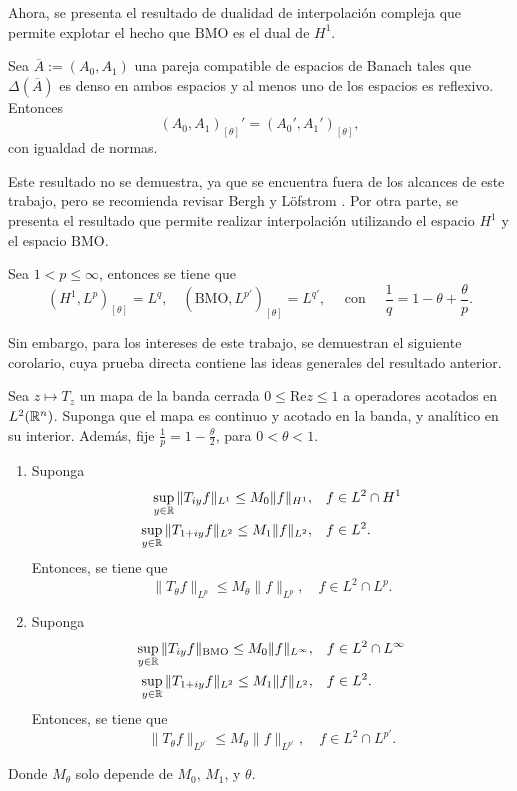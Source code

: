 Ahora, se presenta el resultado de dualidad de interpolación compleja que permite explotar el hecho que $\mathrm{BMO}$ es el dual de $H^1$.
\begin{theorem}
	Sea $\overline{A}:=(A_0, A_1)$ una pareja compatible de espacios de Banach tales que $\Delta(\overline{A})$ es denso en ambos espacios y al menos uno de los espacios es reflexivo. Entonces
	\begin{equation*}
		(A_0, A_1)_{[\theta]}' = (A_0', A_1')_{[\theta]},
	\end{equation*}
	con igualdad de normas.
\end{theorem}
Este resultado no se demuestra, ya que se encuentra fuera de los alcances de este trabajo, pero se recomienda revisar Bergh y Löfstrom \cite{bergh-lofstrom}. Por otra parte, se presenta el resultado que permite realizar interpolación utilizando el espacio $H^1$ y el espacio $\mathrm{BMO}$.
\begin{theorem}
	Sea $1<p\leq\infty$, entonces se tiene que 
	\begin{equation*}
		(H^1,L^p)_{[\theta]} = L^q, \quad (\mathrm{BMO}, L^{p'})_{[\theta]} =L^{q'}, \quad \text{ con } \quad \frac{1}{q} = 1-\theta + \frac{\theta}{p}.
	\end{equation*}
\end{theorem}
Sin embargo, para los intereses de este trabajo, se demuestran el siguiente corolario, cuya prueba directa contiene las ideas generales del resultado anterior.
\begin{corollary}
	Sea $z\mapsto T_z$ un mapa de la banda cerrada $0\leq\mathrm{Re} z\leq1$ a operadores acotados en $L^2(\mathbb{R}^n)$. Suponga que el mapa es continuo y acotado en la banda, y analítico en su interior. Además, fije $\frac{1}{p} = 1- \frac{\theta}{2}$, para $0<\theta<1$.
	\begin{enumerate}
		\item Suponga 
		\begin{align*}
			\sup_{y\in\mathbb{R}} \|T_{iy}f\|_{L^1} \leq M_0\|f\|_{H^1}, &\quad f\in L^2\cap H^1\\
			\sup_{y\in\mathbb{R}} \|T_{1+iy}f\|_{L^2} \leq M_1\|f\|_{L^2}, &\quad f\in L^2.
		\end{align*}
		Entonces,  se tiene que 
		\begin{equation*}
			\|T_\theta f\|_{L^p} \leq M_\theta \|f\|_{L^p}, \quad f \in L^2\cap L^p.
		\end{equation*}
		\item Suponga 
		\begin{align*}
			\sup_{y\in\mathbb{R}} \|T_{iy}f\|_{\mathrm{BMO}} \leq M_0\|f\|_{L^\infty}, &\quad f\in L^2\cap L^\infty \\
			\sup_{y\in\mathbb{R}} \|T_{1+iy}f\|_{L^2} \leq M_1\|f\|_{L^2}, &\quad f\in L^2.
		\end{align*}
		Entonces, se tiene que 
		\begin{equation*}
			\|T_\theta f\|_{L^{p'}} \leq M_\theta \|f\|_{L^{p'}}, \quad f \in L^2\cap L^{p'}.
		\end{equation*}
	\end{enumerate}
	Donde $M_\theta$ solo depende de $M_0$, $M_1$, y $\theta$.
\end{corollary}
